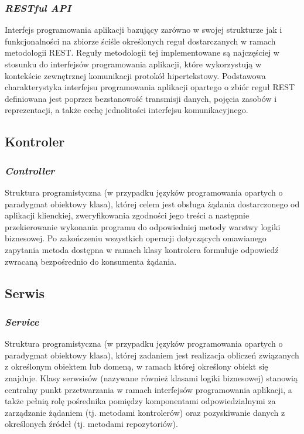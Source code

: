 \subsubsection{\textit{RESTful API}}
Interfejs programowania aplikacji bazujący zarówno w swojej strukturze jak i funkcjonalności na zbiorze ściśle określonych reguł dostarczanych w ramach metodologii REST. Reguły metodologii tej implementowane są najczęściej w stosunku do interfejsów programowania aplikacji, które wykorzystują w kontekście zewnętrznej komunikacji protokół hipertekstowy. Podstawowa charakterystyka interfejsu programowania aplikacji opartego o zbiór reguł REST definiowana jest poprzez bezstanowość transmisji danych, pojęcia zasobów i reprezentacji, a także cechę jednolitości interfejsu komunikacyjnego.

\subsection*{Kontroler}
\subsubsection{\textit{Controller}}
Struktura programistyczna (w przypadku języków programowania opartych o paradygmat obiektowy klasa), której celem jest obsługa żądania dostarczonego od aplikacji klienckiej, zweryfikowania zgodności jego treści a następnie przekierowanie wykonania programu do odpowiedniej metody warstwy logiki biznesowej.
Po zakończeniu wszystkich operacji dotyczących omawianego zapytania metoda dostępna w ramach klasy kontrolera formułuje odpowiedź zwracaną bezpośrednio do konsumenta żądania.

\subsection*{Serwis}
\subsubsection{\textit{Service}}
Struktura programistyczna (w przypadku języków programowania opartych o paradygmat obiektowy klasa), której zadaniem jest realizacja obliczeń związanych z określonym obiektem lub domeną, w ramach której określony obiekt się znajduje. Klasy serwsisów (nazywane również klasami logiki biznesowej) stanowią centralny punkt przetwarzania w ramach interfejsów programowania aplikacji, a także pełnią rolę pośrednika pomiędzy komponentami odpowiedzialnymi za zarządzanie żądaniem (tj. metodami kontrolerów) oraz pozyskiwanie danych z określonych źródeł (tj. metodami repozytoriów).

